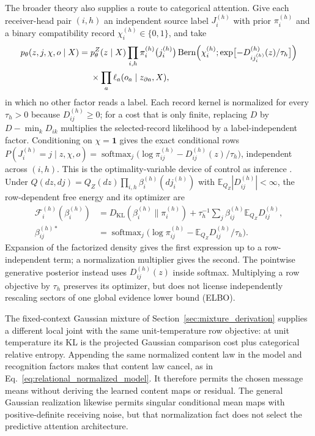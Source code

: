 \documentclass[twoside,11pt]{article}
\begin{document}
The broader theory also supplies a route to categorical attention. Give each receiver-head pair $(i,h)$ an independent source label $J_i^{(h)}$ with prior $\pi_i^{(h)}$ and a binary compatibility record $\chi_i^{(h)}\in\{0,1\}$, and take
\begin{equation}
\begin{aligned}
p_\theta(z,j,\chi,o\mid X)={}&p_\theta^Z(z\mid X)\prod_{i,h}\pi_i^{(h)}\bigl(j_i^{(h)}\bigr)\operatorname{Bern}\Bigl(\chi_i^{(h)};\exp\bigl[-D_{ij_i^{(h)}}^{(h)}(z)/\tau_h\bigr]\Bigr)\\
&\times\prod_a\ell_a(o_a\mid z_{\partial a},X),
\end{aligned}
\label{eq:rg_bridge_record_joint}
\end{equation}
in which no other factor reads a label. Each record kernel is normalized for every $\tau_h>0$ because $D_{ij}^{(h)}\ge0$; for a cost that is only finite, replacing $D$ by $D-\min_kD_{ik}$ multiplies the selected-record likelihood by a label-independent factor. Conditioning on $\chi=\mathbf 1$ gives the exact conditional rows $P(J_i^{(h)}=j\mid z,\chi,o)=\operatorname{softmax}_j\bigl(\log\pi_{ij}^{(h)}-D_{ij}^{(h)}(z)/\tau_h\bigr)$, independent across $(i,h)$. This is the optimality-variable device of control as inference \citep{Levine2018}. Under $Q(dz,dj)=Q_Z(dz)\prod_{i,h}\beta_i^{(h)}(dj_i^{(h)})$ with $\mathbb E_{Q_Z}|D_{ij}^{(h)}|<\infty$, the row-dependent free energy and its optimizer are
\begin{align}
\mathcal F_i^{(h)}(\beta_i^{(h)})&=D_{\mathrm{KL}}(\beta_i^{(h)}\|\pi_i^{(h)})+\tau_h^{-1}\sum_j\beta_{ij}^{(h)}\mathbb E_{Q_Z}D_{ij}^{(h)},\\
\beta_{ij}^{(h)*}&=\operatorname{softmax}_j\bigl(\log\pi_{ij}^{(h)}-\mathbb E_{Q_Z}D_{ij}^{(h)}/\tau_h\bigr).
\label{eq:rg_bridge_row}
\end{align}
Expansion of the factorized density gives the first expression up to a row-independent term; a normalization multiplier gives the second. The pointwise generative posterior instead uses $D_{ij}^{(h)}(z)$ inside softmax. Multiplying a row objective by $\tau_h$ preserves its optimizer, but does not license independently rescaling sectors of one global evidence lower bound (ELBO).

The fixed-context Gaussian mixture of Section~\ref{sec:mixture_derivation} supplies a different local joint with the same unit-temperature row objective: at unit temperature its KL is the projected Gaussian comparison cost plus categorical relative entropy. Appending the same normalized content law in the model and recognition factors makes that content law cancel, as in Eq.~\eqref{eq:relational_normalized_model}. It therefore permits the chosen message means without deriving the learned content maps or residual. The general Gaussian realization likewise permits singular conditional mean maps with positive-definite receiving noise, but that normalization fact does not select the predictive attention architecture.
\end{document}
